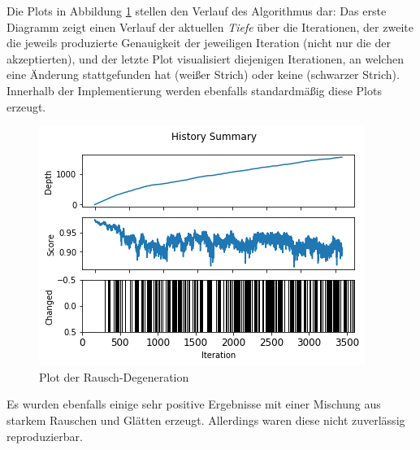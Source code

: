 Die Plots in Abbildung \ref{fig:plotTiefe4000} stellen den Verlauf des Algorithmus dar: 
Das erste Diagramm zeigt einen Verlauf der aktuellen \textit{Tiefe} über die Iterationen, der zweite die jeweils produzierte Genauigkeit der jeweiligen Iteration (nicht nur die der akzeptierten), und der letzte Plot visualisiert diejenigen Iterationen, an welchen eine Änderung stattgefunden hat (weißer Strich) oder keine (schwarzer Strich). 
Innerhalb der Implementierung werden ebenfalls standardmäßig diese Plots erzeugt.

\begin{figure}[h]
	\centering
	\includegraphics[width=0.6\linewidth]{Images/DegenSamples/StopTiefe4000Plot}
	\caption[Plot Degeneration]{Plot der Rausch-Degeneration}
	\label{fig:plotTiefe4000}
\end{figure}
Es wurden ebenfalls einige sehr positive Ergebnisse mit einer Mischung aus starkem Rauschen und Glätten erzeugt. 
Allerdings waren diese nicht zuverlässig reproduzierbar. 


